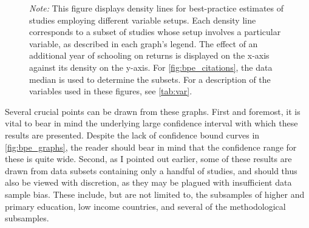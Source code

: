 \begin{figure}[!htbp]
\begin{center}
\end{center}\vspace{-0.6cm}
\captionsetup{width=0.78\textwidth, font = scriptsize}
\caption*{\emph{Note:} This figure displays density lines for best-practice estimates of studies employing different variable setups. Each density line corresponds to a subset of studies whose setup involves a particular variable, as described in each graph's legend. The effect of an additional year of schooling on returns is displayed on the x-axis against its density on the y-axis. For \autoref{fig:bpe_citations}, the data median is used to determine the subsets. For a description of the variables used in these figures, see \autoref{tab:var}.}
\end{figure}

Several crucial points can be drawn from these graphs. First and foremost, it is vital to bear in mind the underlying large confidence interval with which these results are presented. Despite the lack of confidence bound curves in \autoref{fig:bpe_graphs}, the reader should bear in mind that the confidence range for these is quite wide. Second, as I pointed out earlier, some of these results are drawn from data subsets containing only a handful of studies, and should thus also be viewed with discretion, as they may be plagued with insufficient data sample bias. These include, but are not limited to, the subsamples of higher and primary education, low income countries, and several of the methodological subsamples.


